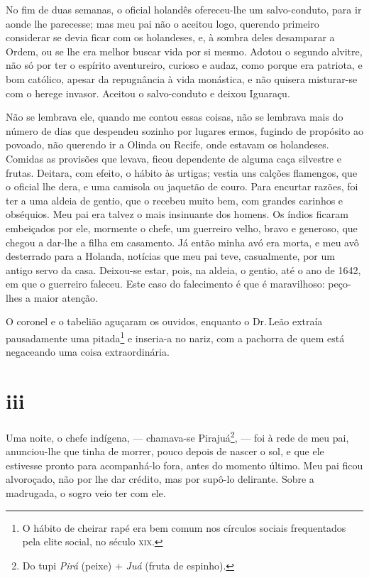 No fim de duas semanas, o oficial holandês ofereceu-lhe um
salvo-conduto, para ir aonde lhe parecesse; mas meu pai não o aceitou
logo, querendo primeiro considerar se devia ficar com os holandeses, e,
à sombra deles desamparar a Ordem, ou se lhe era melhor buscar vida por
si mesmo. Adotou o segundo alvitre, não só por ter o espírito
aventureiro, curioso e audaz, como porque era patriota, e bom católico,
apesar da repugnância à vida monástica, e não quisera misturar-se com o
herege invasor. Aceitou o salvo-conduto e deixou Iguaraçu.

Não se lembrava ele, quando me contou essas coisas, não se lembrava
mais do número de dias que despendeu sozinho por lugares ermos, fugindo
de propósito ao povoado, não querendo ir a Olinda ou Recife, onde
estavam os holandeses. Comidas as provisões que levava, ficou dependente
de alguma caça silvestre e frutas. Deitara, com efeito, o hábito às
urtigas; vestia uns calções flamengos, que o oficial lhe dera, e uma
camisola ou jaquetão de couro. Para encurtar razões, foi ter a uma
aldeia de gentio, que o recebeu muito bem, com grandes carinhos e
obséquios. Meu pai era talvez o mais insinuante dos homens. Os índios
ficaram embeiçados por ele, mormente o chefe, um guerreiro velho, bravo
e generoso, que chegou a dar-lhe a filha em casamento. Já então minha
avó era morta, e meu avô desterrado para a Holanda, notícias que meu pai
teve, casualmente, por um antigo servo da casa. Deixou-se estar, pois,
na aldeia, o gentio, até o ano de 1642, em que o guerreiro faleceu. Este
caso do falecimento é que é maravilhoso: peço-lhes a maior atenção.

O coronel e o tabelião aguçaram os ouvidos, enquanto o Dr.\,Leão extraía
pausadamente uma pitada\footnote{O hábito de cheirar rapé era bem comum
  nos círculos sociais frequentados pela elite social, no século \textsc{xix}.} e
inseria-a no nariz, com a pachorra de quem está negaceando uma coisa
extraordinária.



\section*{iii}



Uma noite, o chefe indígena, --- chamava-se Pirajuá\footnote{Do tupi
  \emph{Pirá} (peixe) + \emph{Juá} (fruta de espinho).}, --- foi à rede
de meu pai, anunciou-lhe que tinha de morrer, pouco depois de nascer o
sol, e que ele estivesse pronto para acompanhá-lo fora, antes do momento
último. Meu pai ficou alvoroçado, não por lhe dar crédito, mas por
supô-lo delirante. Sobre a madrugada, o sogro veio ter com ele.

